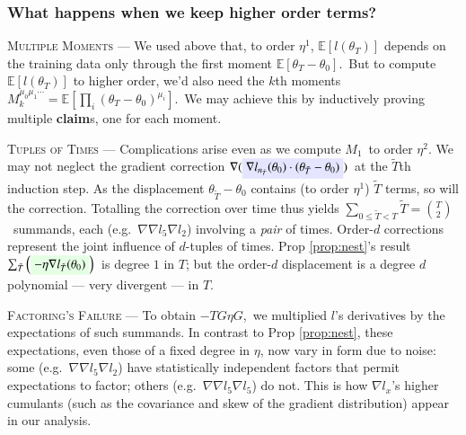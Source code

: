 \documentclass[anon,12pt]{colt2021} %
\newcommand{\translucent}[2]{\colorbox{#1}{#2}}
\newcommand{\squish}{\vspace{-0.05cm}}
\newcommand{\squash}{\vspace{-0.15cm}}
\newcommand{\wrap}[1]{\left(#1\right)}
\newcommand{\wasq}[1]{\left[#1\right]}
\newcommand{\expc}{\mathbb{E}}
\newcommand{\expct}[1]{\mathbb{E}\left[#1\right]}
\begin{document}
            \subsubsection{What happens when we keep higher order terms?}

            \textsc{Multiple Moments} ---
            We used above
            that, to order $\eta^1$, $\expct{l(\theta_T)}$ depends on the
            training data only through the first moment
            \translucent{moopink}{$\expc[\theta_T - \theta_0]$}.\squish\squish\ But to compute  
            $\expct{l(\theta_T)}$ to higher order, we'd also need
            the $k$th moments $M_k^{\mu_0\mu_1\cdots} = \expc\wasq{\prod_i (\theta_T - \theta_0)^{\mu_i}}$.\squish\  We may achieve this by inductively
            proving multiple \textbf{claim}s, one for each moment. 

            \textsc{Tuples of Times} --- Complications arise even as we compute $M_1$\squish\ to order $\eta^2$.  We may not neglect the gradient
            correction $\nabla (\text{\translucent{moosky}{$\nabla
            l_{n_{\tilde T}}(\theta_0) \cdot (\theta_{{\tilde T}} -
            \theta_0)$}})$\squash\ at the $\tilde{T}$th induction step. As the
            displacement $\theta_{{\tilde T}} - \theta_0$ contains (to order
            $\eta^1$) $\tilde T$ terms, so will the correction.
            Totalling the correction over time thus yields
            $\sum_{0\leq \tilde T<T}\tilde T = {T \choose 2}$\squish\
            summands, each (e.g.\ $\nabla\nabla l_{5} \nabla l_{2}$)
            involving a \emph{pair} of times.  Order-$d$
            corrections represent the joint influence of $d$-tuples of times.
            Prop \ref{prop:nest}'s result $\sum_{\tilde T}
            \wrap{\text{\translucent{moolime}{$- \eta \nabla l_{{\tilde
            T}}(\theta_0)$}}}$\squish\squish\ is degree $1$ in $T$; but the
            order-$d$ displacement is a degree $d$ polynomial --- very divergent --- in $T$.

            \textsc{Factoring's Failure} --- To obtain \translucent{moogold}{$-TG\eta G$},\squish\ we multiplied
            $l$'s derivatives by the expectations of such summands.
            In contrast to Prop \ref{prop:nest}, these expectations, even those of a fixed
            degree in $\eta$, now vary in form due to noise: some (e.g.\
            $\nabla\nabla l_{5} \nabla l_{2}$) have statistically independent
            factors that permit expectations to factor; others (e.g.\
            $\nabla\nabla l_{5} \nabla l_{5}$) do not.  This is how $\nabla
            l_x$'s higher cumulants (such as the covariance and skew of the gradient distribution) appear in our analysis.
\end{document}
